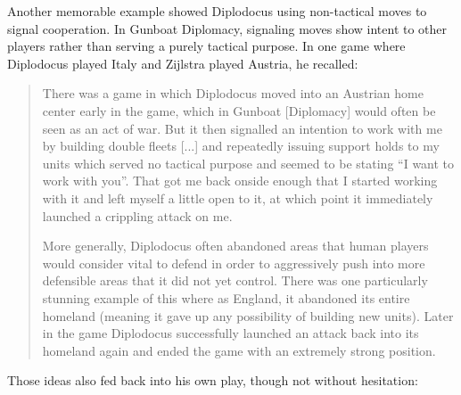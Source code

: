 Another memorable example showed Diplodocus using non-tactical moves to signal cooperation. In Gunboat Diplomacy, signaling moves show intent to other players rather than serving a purely tactical purpose. In one game where Diplodocus played Italy and Zijlstra played Austria, he recalled:

\begin{quote}
There was a game in which Diplodocus moved into an Austrian home center early in the game, which in Gunboat [Diplomacy] would often be seen as an act of war. But it then signalled an intention to work with me by building double fleets [...] and repeatedly issuing support holds to my units which served no tactical purpose and seemed to be stating ``I want to work with you''. That got me back onside enough that I started working with it and left myself a little open to it, at which point it immediately launched a crippling attack on me.

More generally, Diplodocus often abandoned areas that human players would consider vital to defend in order to aggressively push into more defensible areas that it did not yet control.
There was one particularly stunning example of this where as England, it abandoned its entire homeland (meaning it gave up any possibility of building new units). Later in the game Diplodocus successfully launched an attack back into its homeland again and ended the game with an extremely strong position. 

\end{quote}

Those ideas also fed back into his own play, though not without hesitation:

